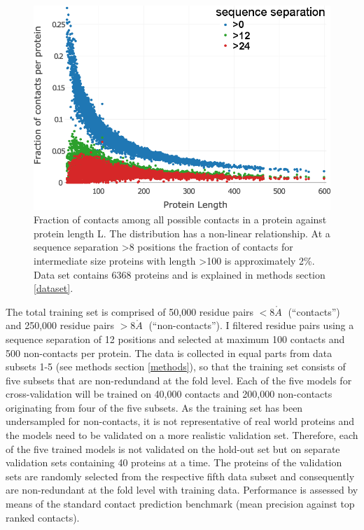 \documentclass[11pt,a4paper,twoside]{book}
\newcommand{\angstrom}{\mathring{A} \;}
\theoremstyle{definition}
\theoremstyle{definition}
\theoremstyle{remark}
\begin{document}
\begin{figure}

{\centering \includegraphics[width=0.8\linewidth]{img/random_forest_contact_prior/fraction_contacts_vs_protein_length_thr8} 

}

\caption{Fraction of contacts
among all possible contacts in a protein against protein length L. The
distribution has a non-linear relationship. At a sequence separation
\textgreater{}8 positions the fraction of contacts for intermediate size
proteins with length \textgreater{}100 is approximately 2\%. Data set
contains 6368 proteins and is explained in methods section
\ref{dataset}.}\label{fig:fraction-contacts-vs-protein-length}
\end{figure}

The total training set is comprised of 50,000 residue pairs
\(<8 \angstrom\) (``contacts'') and 250,000 residue pairs
\(>8 \angstrom\) (``non-contacts''). I filtered residue pairs using a
sequence separation of 12 positions and selected at maximum 100 contacts
and 500 non-contacts per protein. The data is collected in equal parts
from data subsets 1-5 (see methods section \ref{methods}), so that the
training set consists of five subsets that are non-redundand at the fold
level. Each of the five models for cross-validation will be trained on
40,000 contacts and 200,000 non-contacts originating from four of the
five subsets. As the training set has been undersampled for
non-contacts, it is not representative of real world proteins and the
models need to be validated on a more realistic validation set.
Therefore, each of the five trained models is not validated on the
hold-out set but on separate validation sets containing 40 proteins at a
time. The proteins of the validation sets are randomly selected from the
respective fifth data subset and consequently are non-redundant at the
fold level with training data. Performance is assessed by means of the
standard contact prediction benchmark (mean precision against top ranked
contacts).
\end{document}
